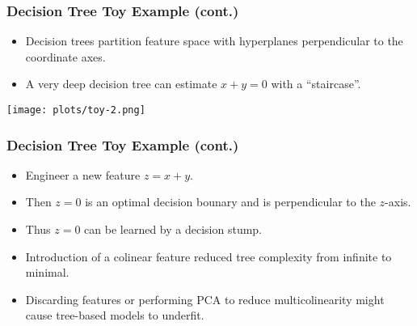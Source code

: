 \documentclass{beamer}
\begin{document}
\begin{frame}
\frametitle{Decision Tree Toy Example (cont.)}
\begin{itemize}
\item Decision trees partition feature space with hyperplanes perpendicular to the coordinate axes.
\item A very deep decision tree can estimate $x+y=0$ with a ``staircase''.
\end{itemize}
\begin{center}
\texttt{[image: plots/toy-2.png]}
\end{center}
\end{frame}

\begin{frame}
\frametitle{Decision Tree Toy Example (cont.)}
\begin{itemize}
\item Engineer a new feature $z = x+y$.
\item Then $z=0$ is an optimal decision bounary and is perpendicular to the $z$-axis.
\item Thus $z=0$ can be learned by a decision stump.
\item Introduction of a colinear feature reduced tree complexity from infinite to minimal.
\item Discarding features or performing PCA to reduce multicolinearity might cause tree-based models to underfit.
\end{itemize}
\end{frame}
\end{document}
